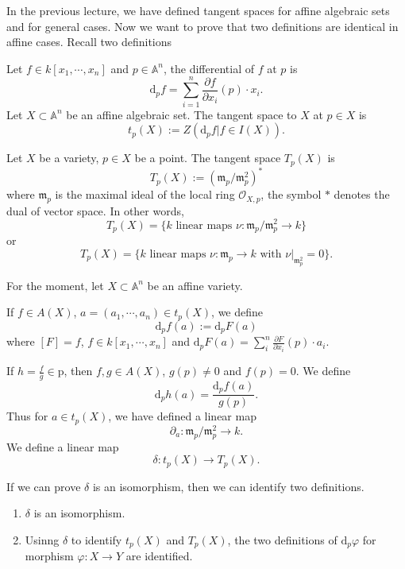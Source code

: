 In the previous lecture, we have defined tangent spaces for affine algebraic sets and for general cases. Now we want to prove  that two definitions are identical in affine cases. Recall two definitions
\begin{definition}
	Let $ f\in k [x_1,\cdots,x_n] $ and $ p\in \mathbb{A}^n $, the differential of $ f $ at $ p $ is
	$$
		\mathrm{d}_pf=\sum\limits_{i=1}^n\frac{\partial f}{\partial x_i}(p)\cdot x_i.
	$$
	Let $ X\subset \mathbb{A}^n $ be an affine algebraic set. The tangent space to $ X $ at $ p\in X $ is
	$$
		t_p(X):=Z(\mathrm{d}_pf|f\in I(X)).
	$$
\end{definition}
\begin{definition}
	Let $ X $ be a variety, $ p\in X $ be a point. The tangent space $ T_p(X) $ is
	$$
		T_p(X):=(\mathfrak{m}_p/\mathfrak{m}_p^2)^{\ast}
	$$
	where $ \mathfrak{m}_p $ is the maximal ideal of the local ring $ \mathcal{O}_{X,p} $, the symbol $ \ast $ denotes the dual of vector space. In other words,
	$$
		T_p(X)=\lbrace k \text{ linear maps }\nu: \mathfrak{m}_p/\mathfrak{m}_p^2\to k \rbrace
	$$
	or
	$$
		T_p(X)=\lbrace k \text{ linear maps }\nu: \mathfrak{m}_p\to k \text{ with } \nu|_{\mathfrak{m}_p^2}=0  \rbrace.
	$$
\end{definition}
For the moment, let $ X\subset \mathbb{A}^n $ be an affine variety.
\begin{definition}
	If $ f\in A(X) $, $ a=(a_1,\cdots,a_n)\in t_p(X) $, we define
	$$
		\mathrm{d}_pf(a):=\mathrm{d}_pF(a)
	$$
	where $ [F]=f $, $ f\in k[x_1,\cdots,x_n] $ and $ \mathrm{d}_pF(a)=\sum\limits_{i}^n \frac{\partial F}{\partial x_i}(p)\cdot a_i $.

	If $ h=\frac{f}{g}\in \mathrm{p} $, then $ f,g\in A(X) $, $ g(p)\neq 0 $ and $ f(p)=0 $. We define
	$$
		\mathrm{d}_ph(a)=\frac{\mathrm{d}_pf(a)}{g(p)}.
	$$
	Thus for $ a\in t_p(X) $, we have defined a linear map
	$$
		\partial_a:\mathfrak{m}_p/\mathfrak{m}_p^2\to k.
	$$
	We define a linear map
	$$
		\delta: t_p(X)\to T_p(X).
	$$
\end{definition}
If we can prove $ \delta $ is an isomorphism, then we can identify two definitions.
\begin{theorem}{}
  \noindent
	\begin{enumerate}
		\item $ \delta $ is an isomorphism.
		\item Usinng $ \delta $ to identify $ t_p(X) $ and $ T_p(X) $, the two definitions of $ \mathrm{d}_p\varphi $ for morphism $ \varphi :X\to Y $ are identified.
	\end{enumerate}
\end{theorem}
